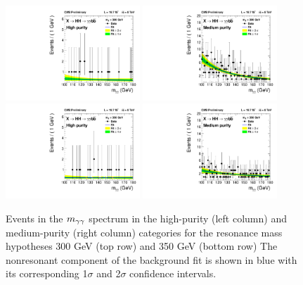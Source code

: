 \begin{figure}[ht!]
 \begin{center}
   \includegraphics[width=0.45\textwidth]{figures/results/databkgoversig_cat0_300GeV.pdf}
   \includegraphics[width=0.45\textwidth]{figures/results/databkgoversig_cat1_300GeV.pdf}
   \includegraphics[width=0.45\textwidth]{figures/results/databkgoversig_cat0_350GeV.pdf}
   \includegraphics[width=0.45\textwidth]{figures/results/databkgoversig_cat1_350GeV.pdf}
 \end{center}
\caption{Events in the $m_{\gamma\gamma}$ spectrum in the high-purity (left column) and medium-purity
(right column) categories for the resonance mass hypotheses 300 GeV (top row) and 350 GeV (bottom row)
The nonresonant component of the background fit is shown in blue
with its corresponding 1$\sigma$ and 2$\sigma$ confidence intervals.}
\label{fig:datafit_300}
\end{figure}

